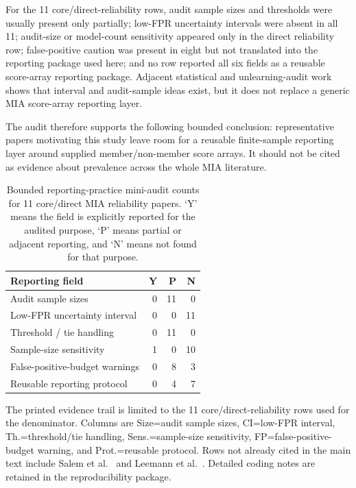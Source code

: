 \documentclass[
  10pt,
  twocolumn]{article}
\begin{document}
For the 11 core/direct-reliability rows, audit sample sizes and thresholds were usually present only partially; low-FPR uncertainty intervals were absent in all 11; audit-size or model-count sensitivity appeared only in the direct reliability row; false-positive caution was present in eight but not translated into the reporting package used here; and no row reported all six fields as a reusable score-array reporting package. Adjacent statistical and unlearning-audit work shows that interval and audit-sample ideas exist, but it does not replace a generic MIA score-array reporting layer.

The audit therefore supports the following bounded conclusion: representative papers motivating this study leave room for a reusable finite-sample reporting layer around supplied member/non-member score arrays. It should not be cited as evidence about prevalence across the whole MIA literature.

\begin{table}[H]
\centering
\scriptsize
\caption{Bounded reporting-practice mini-audit counts for 11 core/direct MIA reliability papers. `Y' means the field is explicitly reported for the audited purpose, `P' means partial or adjacent reporting, and `N' means not found for that purpose.}
\label{tab:appendix-reporting-audit-counts}
\begin{tabularx}{\columnwidth}{Y r r r}
\toprule
Reporting field & Y & P & N \\
\midrule
Audit sample sizes & 0 & 11 & 0 \\
Low-FPR uncertainty interval & 0 & 0 & 11 \\
Threshold / tie handling & 0 & 11 & 0 \\
Sample-size sensitivity & 1 & 0 & 10 \\
False-positive-budget warnings & 0 & 8 & 3 \\
Reusable reporting protocol & 0 & 4 & 7 \\
\bottomrule
\end{tabularx}
\end{table}

The printed evidence trail is limited to the 11 core/direct-reliability rows used for the denominator. Columns are Size=audit sample sizes, CI=low-FPR interval, Th.=threshold/tie handling, Sens.=sample-size sensitivity, FP=false-positive-budget warning, and Prot.=reusable protocol. Rows not already cited in the main text include Salem et al.~\cite{ref-13} and Leemann et al.~\cite{ref-14}. Detailed coding notes are retained in the reproducibility package.
\end{document}
